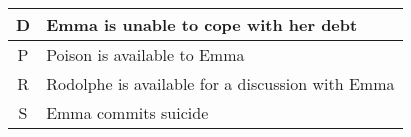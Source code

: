 \begin{footnotesize}
\begin{tabular}{|c|p{}|}
\hline
D & Emma is unable to cope with her debt\\ \hline
P & Poison is available to Emma\\ \hline
R & Rodolphe is available for a discussion with Emma\\ \hline
S & Emma commits suicide\\
\hline
\end{tabular}
\end{footnotesize} 